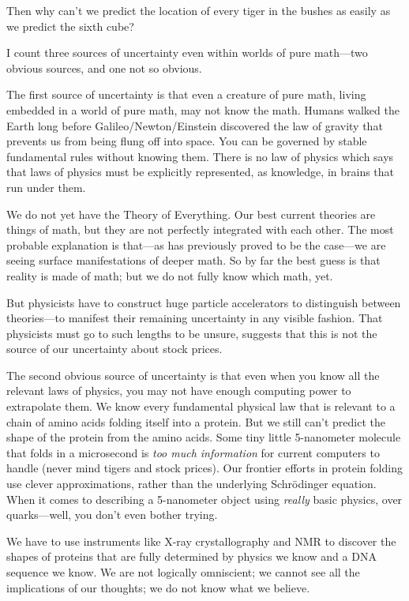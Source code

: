 {
 Then why can't we predict the location of every
tiger in the bushes as easily as we predict the sixth cube?}

{
 I count three sources of uncertainty even within worlds of pure
math---two obvious sources, and one not so obvious.}

{
 The first source of uncertainty is that even a creature of pure
math, living embedded in a world of pure math, may not know the math.
Humans walked the Earth long before Galileo/Newton/Einstein discovered
the law of gravity that prevents us from being flung off into space.
You can be governed by stable fundamental rules without knowing them.
There is no law of physics which says that laws of physics must be
explicitly represented, as knowledge, in brains that run under them.}

{
 We do not yet have the Theory of Everything. Our best current
theories are things of math, but they are not perfectly integrated with
each other. The most probable explanation is that---as has previously
proved to be the case---we are seeing surface manifestations of deeper
math. So by far the best guess is that reality is made of math; but we
do not fully know which math, yet.}

{
 But physicists have to construct huge particle accelerators to
distinguish between theories---to manifest their remaining uncertainty
in any visible fashion. That physicists must go to such lengths to be
unsure, suggests that this is not the source of our uncertainty about
stock prices.}

{
 The second obvious source of uncertainty is that even when you
know all the relevant laws of physics, you may not have enough
computing power to extrapolate them. We know every fundamental physical
law that is relevant to a chain of amino acids folding itself into a
protein. But we still can't predict the shape of the
protein from the amino acids. Some tiny little 5-nanometer molecule
that folds in a microsecond is \textit{too much information} for
current computers to handle (never mind tigers and stock prices). Our
frontier efforts in protein folding use clever approximations, rather
than the underlying Schrödinger equation. When it comes to describing a
5-nanometer object using \textit{really} basic physics, over
quarks---well, you don't even bother trying.}

{
 We have to use instruments like X-ray crystallography and NMR to
discover the shapes of proteins that are fully determined by physics we
know and a DNA sequence we know. We are not logically omniscient; we
cannot see all the implications of our thoughts; we do not know what we
believe.}

